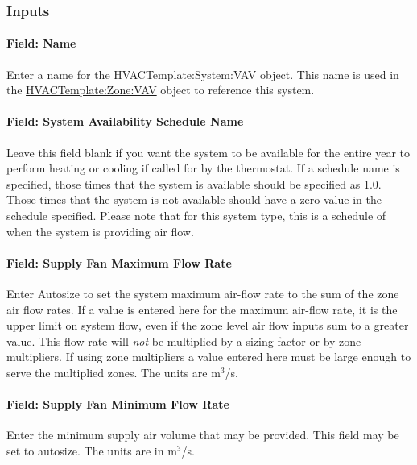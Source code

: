 \subsubsection{Inputs}\label{inputs-18-002}

\paragraph{Field: Name}\label{field-name-5-010}

Enter a name for the HVACTemplate:System:VAV object. This name is used in the \hyperref[hvactemplatezonevav]{HVACTemplate:Zone:VAV} object to reference this system.

\paragraph{Field: System Availability Schedule Name}\label{field-system-availability-schedule-name-10}

Leave this field blank if you want the system to be available for the entire year to perform heating or cooling if called for by the thermostat. If a schedule name is specified, those times that the system is available should be specified as 1.0. Those times that the system is not available should have a zero value in the schedule specified. Please note that for this system type, this is a schedule of when the system is providing air flow.

\paragraph{Field: Supply Fan Maximum Flow Rate}\label{field-supply-fan-maximum-flow-rate-1}

Enter Autosize to set the system maximum air-flow rate to the sum of the zone air flow rates. If a value is entered here for the maximum air-flow rate, it is the upper limit on system flow, even if the zone level air flow inputs sum to a greater value. This flow rate will \emph{not} be multiplied by a sizing factor or by zone multipliers. If using zone multipliers a value entered here must be large enough to serve the multiplied zones. The units are m\(^{3}\)/s.

\paragraph{Field: Supply Fan Minimum Flow Rate}\label{field-supply-fan-minimum-flow-rate}

Enter the minimum supply air volume that may be provided. This field may be set to autosize. The units are in m\(^{3}\)/s.

